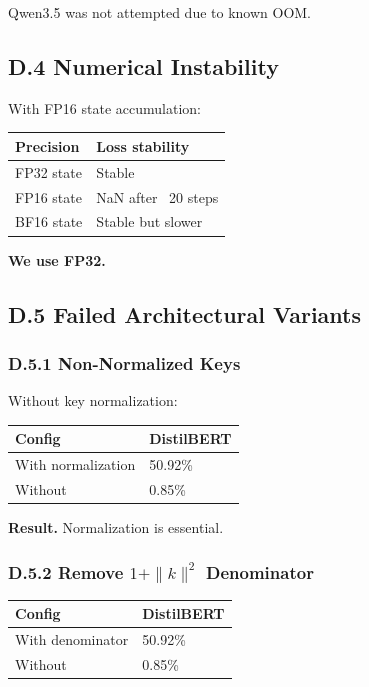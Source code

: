 Qwen3.5 was not attempted due to known OOM.

\subsection{D.4 Numerical Instability}

With FP16 state accumulation:

\begin{table}[H]
\centering
\small
\begin{tabular}{ll}
\toprule
\textbf{Precision} & \textbf{Loss stability} \\
\midrule
FP32 state & Stable \\
FP16 state & NaN after ~20 steps \\
BF16 state & Stable but slower \\
\bottomrule
\end{tabular}
\end{table}

\textbf{We use FP32.}

\subsection{D.5 Failed Architectural Variants}

\subsubsection{D.5.1 Non-Normalized Keys}

Without key normalization:

\begin{table}[H]
\centering
\small
\begin{tabular}{ll}
\toprule
\textbf{Config} & \textbf{DistilBERT} \\
\midrule
With normalization & 50.92\% \\
Without & 0.85\% \\
\bottomrule
\end{tabular}
\end{table}

\textbf{Result.} Normalization is essential.

\subsubsection{D.5.2 Remove $1 + \|k\|^2$ Denominator}

\begin{table}[H]
\centering
\small
\begin{tabular}{ll}
\toprule
\textbf{Config} & \textbf{DistilBERT} \\
\midrule
With denominator & 50.92\% \\
Without & 0.85\% \\
\bottomrule
\end{tabular}
\end{table}

